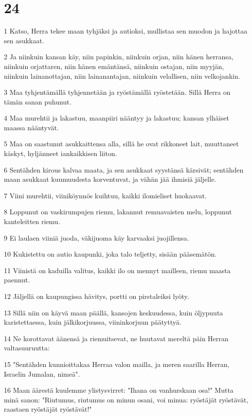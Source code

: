 \chapter{24}

\par 1 Katso, Herra tekee maan tyhjäksi ja autioksi, mullistaa sen muodon ja hajottaa sen asukkaat.
\par 2 Ja niinkuin kansan käy, niin papinkin, niinkuin orjan, niin hänen herransa, niinkuin orjattaren, niin hänen emäntänsä, niinkuin ostajan, niin myyjän, niinkuin lainanottajan, niin lainanantajan, niinkuin velallisen, niin velkojankin.
\par 3 Maa tyhjentämällä tyhjennetään ja ryöstämällä ryöstetään. Sillä Herra on tämän sanan puhunut.
\par 4 Maa murehtii ja lakastuu, maanpiiri nääntyy ja lakastuu; kansan ylhäiset maassa nääntyvät.
\par 5 Maa on saastunut asukkaittensa alla, sillä he ovat rikkoneet lait, muuttaneet käskyt, hyljänneet iankaikkisen liiton.
\par 6 Sentähden kirous kalvaa maata, ja sen asukkaat syystänsä kärsivät; sentähden maan asukkaat kuumuudesta korventuvat, ja vähän jää ihmisiä jäljelle.
\par 7 Viini murehtii, viiniköynnös kuihtuu, kaikki ilomieliset huokaavat.
\par 8 Loppunut on vaskirumpujen riemu, lakannut remuavaisten melu, loppunut kanteleitten riemu.
\par 9 Ei laulaen viiniä juoda, väkijuoma käy karvaaksi juojillensa.
\par 10 Kukistettu on autio kaupunki, joka talo teljetty, sisään pääsemätön.
\par 11 Viinistä on kaduilla valitus, kaikki ilo on mennyt mailleen, riemu maasta paennut.
\par 12 Jäljellä on kaupungissa hävitys, portti on pirstaleiksi lyöty.
\par 13 Sillä niin on käyvä maan päällä, kansojen keskuudessa, kuin öljypuuta karistettaessa, kuin jälkikorjuussa, viininkorjuun päätyttyä.
\par 14 Ne korottavat äänensä ja riemuitsevat, ne huutavat mereltä päin Herran valtasuuruutta:
\par 15 "Sentähden kunnioittakaa Herraa valon mailla, ja meren saarilla Herran, Israelin Jumalan, nimeä".
\par 16 Maan äärestä kuulemme ylistysvirret: "Ihana on vanhurskaan osa!" Mutta minä sanon: "Riutumus, riutumus on minun osani, voi minua: ryöstäjät ryöstävät, raastaen ryöstäjät ryöstävät!"

